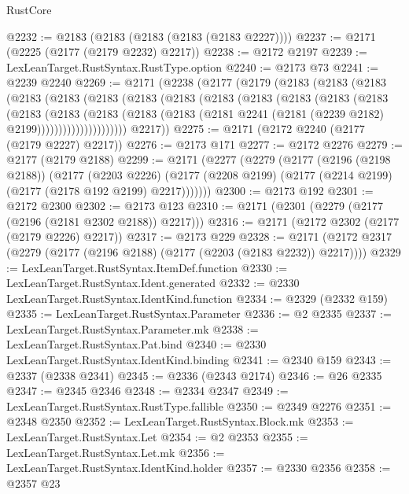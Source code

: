 \begin{lexlean}{RustCore}
\begin{coremodule}
@2232 := @2183 (@2183 (@2183 (@2183 (@2183 @2227))))
@2237 := @2171 (@2225 (@2177 (@2179 @2232) @2217))
@2238 := @2172 @2197
@2239 := LexLeanTarget.RustSyntax.RustType.option
@2240 := @2173 @73
@2241 := @2239 @2240
@2269 := @2171
    (@2238
      (@2177
        (@2179
          (@2183
            (@2183
              (@2183
                (@2183
                  (@2183
                    (@2183
                      (@2183
                        (@2183
                          (@2183
                            (@2183
                              (@2183
                                (@2183
                                  (@2183
                                    (@2183
                                      (@2183
                                        (@2183
                                          (@2183
                                            (@2183
                                              (@2181
                                                @2241
                                                (@2181 (@2239 @2182) @2199)))))))))))))))))))))
        @2217))
@2275 := @2171 (@2172 @2240 (@2177 (@2179 @2227) @2217))
@2276 := @2173 @171
@2277 := @2172 @2276
@2279 := @2177 (@2179 @2188)
@2299 := @2171
    (@2277
      (@2279
        (@2177
          (@2196 (@2198 @2188))
          (@2177
            (@2203 @2226)
            (@2177 (@2208 @2199) (@2177 (@2214 @2199) (@2177 (@2178 @192 @2199) @2217)))))))
@2300 := @2173 @192
@2301 := @2172 @2300
@2302 := @2173 @123
@2310 := @2171 (@2301 (@2279 (@2177 (@2196 (@2181 @2302 @2188)) @2217)))
@2316 := @2171 (@2172 @2302 (@2177 (@2179 @2226) @2217))
@2317 := @2173 @229
@2328 := @2171 (@2172 @2317 (@2279 (@2177 (@2196 @2188) (@2177 (@2203 (@2183 @2232)) @2217))))
@2329 := LexLeanTarget.RustSyntax.ItemDef.function
@2330 := LexLeanTarget.RustSyntax.Ident.generated
@2332 := @2330 LexLeanTarget.RustSyntax.IdentKind.function
@2334 := @2329 (@2332 @159)
@2335 := LexLeanTarget.RustSyntax.Parameter
@2336 := @2 @2335
@2337 := LexLeanTarget.RustSyntax.Parameter.mk
@2338 := LexLeanTarget.RustSyntax.Pat.bind
@2340 := @2330 LexLeanTarget.RustSyntax.IdentKind.binding
@2341 := @2340 @159
@2343 := @2337 (@2338 @2341)
@2345 := @2336 (@2343 @2174)
@2346 := @26 @2335
@2347 := @2345 @2346
@2348 := @2334 @2347
@2349 := LexLeanTarget.RustSyntax.RustType.fallible
@2350 := @2349 @2276
@2351 := @2348 @2350
@2352 := LexLeanTarget.RustSyntax.Block.mk
@2353 := LexLeanTarget.RustSyntax.Let
@2354 := @2 @2353
@2355 := LexLeanTarget.RustSyntax.Let.mk
@2356 := LexLeanTarget.RustSyntax.IdentKind.holder
@2357 := @2330 @2356
@2358 := @2357 @23

\end{coremodule}
\end{lexlean}
